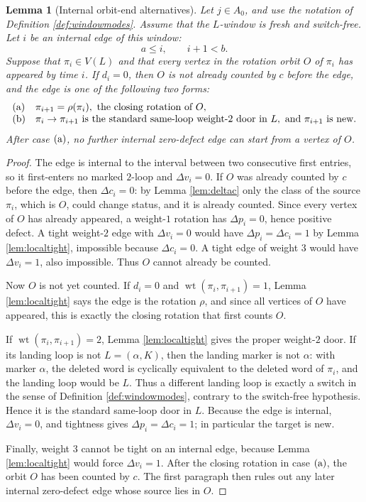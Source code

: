 \documentclass[11pt]{article}
\newtheorem{lemma}[theorem]{Lemma}
\DeclareMathOperator{\wt}{wt}
\begin{document}
\begin{lemma}[Internal orbit-end alternatives]\label{lem:orbitendclass}
Let \(j\in A_0\), and use the notation of Definition \ref{def:windowmodes}.  Assume that the
\(L\)-window is fresh and switch-free.  Let \(i\) be an internal edge of this window:
\[
  a\le i,\qquad i+1<b.
\]
Suppose that \(\pi_i\in V(L)\) and that every vertex in the rotation orbit
\(O\) of \(\pi_i\) has appeared by time \(i\).  If \(d_i=0\), then \(O\) is not already counted by
\(c\) before the edge, and the edge is one of the following two forms:
\[
\begin{array}{ll}
\text{\rm (a)} & \pi_{i+1}=\rho(\pi_i),\text{ the closing rotation of }O,\\
\text{\rm (b)} & \pi_i\to\pi_{i+1}\text{ is the standard same-loop weight-\(2\) door in }L,
                  \text{ and }\pi_{i+1}\text{ is new.}
\end{array}
\]
After case \({\rm (a)}\), no further internal zero-defect edge can start from a vertex of \(O\).
\end{lemma}

\begin{proof}
The edge is internal to the interval between two consecutive first entries, so it first-enters no
marked \(2\)-loop and \(\Delta v_i=0\).  If \(O\) was already counted by \(c\) before the edge,
then \(\Delta c_i=0\): by Lemma \ref{lem:deltac} only the class of the source \(\pi_i\), which is
\(O\), could change status, and it is already counted.  Since every vertex of \(O\) has already
appeared, a weight-\(1\) rotation
has \(\Delta p_i=0\), hence positive defect.  A tight weight-\(2\) edge with \(\Delta v_i=0\)
would have \(\Delta p_i=\Delta c_i=1\) by Lemma \ref{lem:localtight}, impossible because
\(\Delta c_i=0\).  A tight edge of weight \(3\) would have \(\Delta v_i=1\), also impossible.
Thus \(O\) cannot already be counted.

Now \(O\) is not yet counted.  If \(d_i=0\) and \(\wt(\pi_i,\pi_{i+1})=1\), Lemma
\ref{lem:localtight} says the edge is the rotation \(\rho\), and since all vertices of \(O\) have
appeared, this is exactly the closing rotation that first counts \(O\).

If \(\wt(\pi_i,\pi_{i+1})=2\), Lemma \ref{lem:localtight} gives the proper weight-\(2\) door.  If
its landing loop is not \(L=(\alpha,K)\), then the landing marker is not \(\alpha\): with marker \(\alpha\), the
deleted word is cyclically equivalent to the deleted word of \(\pi_i\), and the landing loop would
be \(L\).  Thus a different landing loop is exactly a switch in the sense of Definition
\ref{def:windowmodes}, contrary to the switch-free hypothesis.  Hence it is the standard
same-loop door in \(L\).  Because the edge is internal, \(\Delta v_i=0\), and tightness gives
\(\Delta p_i=\Delta c_i=1\); in particular the target is new.

Finally, weight \(3\) cannot be tight on an internal edge, because Lemma \ref{lem:localtight}
would force \(\Delta v_i=1\).  After the closing rotation in case \({\rm (a)}\), the orbit \(O\)
has been counted by \(c\).  The first paragraph then rules out any later internal zero-defect edge
whose source lies in \(O\).
\end{proof}
\end{document}
